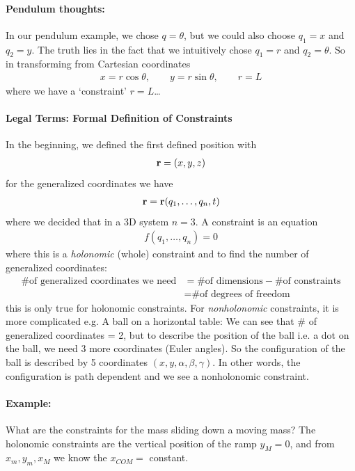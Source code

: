 \documentclass[../main.tex]{subfiles}
\begin{document}
\paragraph*{Pendulum thoughts:} In our pendulum example, we chose $q = \theta$, but we could also
choose $q_1 = x$ and $q_2 = y$. The truth lies in the fact that we intuitively chose $q_1 = r$ and
$q_2 = \theta$. So in transforming from Cartesian coordinates
\begin{align*}
    x = r\cos\theta, \qquad y = r\sin\theta, \qquad r = L
\end{align*}
where we have a `constraint' $r = L$\dots

\paragraph*{Legal Terms: Formal Definition of Constraints} In the beginning, we defined the first defined position with
\begin{align*}
    \vb r = (x, y, z)
\end{align*}
for the generalized coordinates we have
\begin{align*}
    \vb r = \vb r(q_1, \dots, q_n, t)
\end{align*}
where we decided that in a 3D system $n = 3$. A constraint is an equation
\begin{align*}
    f(q_1, \dots, q_n) = 0
\end{align*}
where this is a \emph{holonomic} (whole) constraint and to find the number of generalized coordinates:
\begin{align*}
    \text{\# of generalized coordinates we need} &= \text{\# of dimensions} - \text{\# of constraints}  \\
    &= \text{\# of degrees of freedom}
\end{align*}
this is only true for holonomic constraints. For \emph{nonholonomic} constraints, it is more complicated
e.g. A ball on a horizontal table: We can see that \# of generalized coordinates = 2, but to
describe the position of the ball i.e. a dot on the ball, we need 3 more coordinates (Euler angles).
So the configuration of the ball is described by 5 coordinates $(x, y, \alpha, \beta, \gamma)$. In
other words, the configuration is path dependent and we see a nonholonomic constraint.

\paragraph*{Example:} What are the constraints for the mass sliding down a moving mass? The 
holonomic constraints are the vertical position of the ramp $y_M = 0$, and from $x_m, y_m, x_M$ we 
know the $x_{COM} =$ constant.
\end{document}

